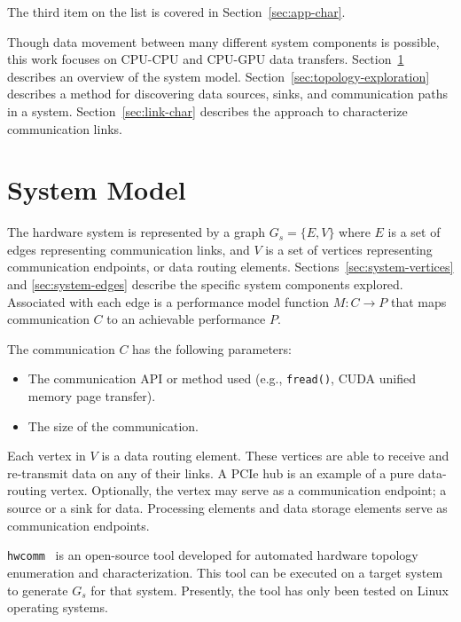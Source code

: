 The third item on the list is covered in Section~\ref{sec:app-char}.

Though data movement between many different system components is possible, this work focuses on CPU-CPU and CPU-GPU data transfers.
Section~\ref{sec:system-model} describes an overview of the system model.
Section~\ref{sec:topology-exploration} describes a method for discovering data sources, sinks, and communication paths in a system.
Section~\ref{sec:link-char} describes the approach to characterize communication links.

\section{System Model}
\label{sec:system-model}

The hardware system is represented by a graph $G_s = \{E,V\}$ where $E$ is a set of edges representing communication links, and $V$ is a set of vertices representing communication endpoints, or data routing elements.
Sections~\ref{sec:system-vertices} and \ref{sec:system-edges} describe the specific system components explored.
Associated with each edge is a performance model function $M: C \rightarrow P$ that maps communication $C$ to an achievable performance $P$.

The communication $C$ has the following parameters:
\begin{itemize}
    \item The communication API or method used (e.g., \texttt{fread()}, CUDA unified memory page transfer).
    \item The size of the communication.
\end{itemize}


Each vertex in $V$ is a data routing element.
These vertices are able to receive and re-transmit data on any of their links.
A PCIe hub  is an example of a pure data-routing vertex.
Optionally, the vertex may serve as a communication endpoint; a source or a sink for data.
Processing elements and data storage elements serve as communication endpoints.


\texttt{hwcomm}~\cite{pearson2018hwcomm} is an open-source tool developed for automated hardware topology enumeration and characterization.
This tool can be executed on a target system to generate $G_s$ for that system.
Presently, the tool has only been tested on Linux operating systems.



